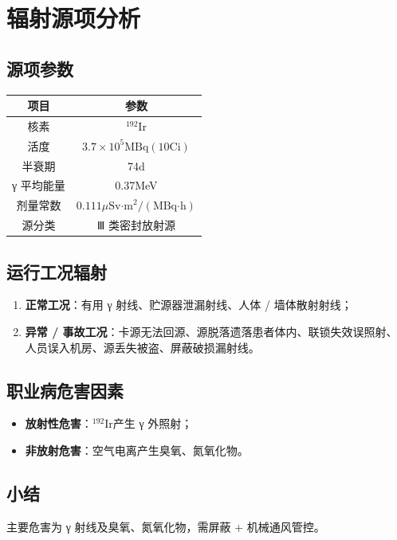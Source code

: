 \chapter{辐射源项分析}

\section{源项参数}

\begin{table}[H]
\centering
\begin{tabular}{|c|c|}
\hline
项目 & 参数 \\
\hline
核素 & $^{192}\text{Ir}$ \\
\hline
活度 & $3.7×10^{5}\text{MBq}(10\text{Ci})$ \\
\hline
半衰期 & 74d \\
\hline
γ 平均能量 & 0.37MeV \\
\hline
剂量常数 & $0.111\mu\text{Sv·m}^2/(\text{MBq·h})$ \\
\hline
源分类 & Ⅲ 类密封放射源 \\
\hline
\end{tabular}
\end{table}


\section{运行工况辐射}

\begin{enumerate}
\item \textbf{正常工况}：有用 γ 射线、贮源器泄漏射线、人体 / 墙体散射射线；
\item \textbf{异常 / 事故工况}：卡源无法回源、源脱落遗落患者体内、联锁失效误照射、人员误入机房、源丢失被盗、屏蔽破损漏射线。
\end{enumerate}

\section{职业病危害因素}

\begin{itemize}
\item \textbf{放射性危害}：$^{192}\text{Ir}$产生 γ 外照射；
\item \textbf{非放射危害}：空气电离产生臭氧、氮氧化物。
\end{itemize}

\section{小结}

主要危害为 γ 射线及臭氧、氮氧化物，需屏蔽 + 机械通风管控。
